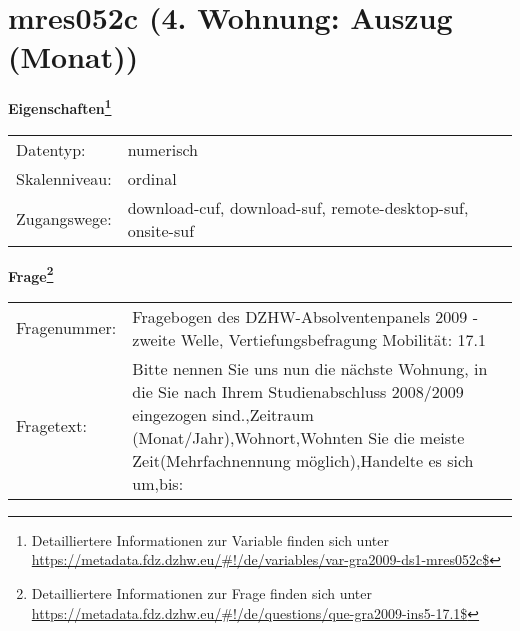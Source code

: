 
    \setcounter{footnote}{0}

    \vspace*{-1.8cm}
	\section{mres052c (4. Wohnung: Auszug (Monat))}
	\label{section:mres052c}



    \vspace*{0.5cm}
    \noindent\textbf{Eigenschaften\footnote{Detailliertere Informationen zur Variable finden sich unter
		\url{https://metadata.fdz.dzhw.eu/\#!/de/variables/var-gra2009-ds1-mres052c$}}}\\
	\begin{tabularx}{\hsize}{@{}lX}
	Datentyp: & numerisch \\
	Skalenniveau: & ordinal \\
	Zugangswege: &
	  download-cuf, 
	  download-suf, 
	  remote-desktop-suf, 
	  onsite-suf
 \\
    \end{tabularx}



				\vspace*{0.5cm}
                \noindent\textbf{Frage\footnote{Detailliertere Informationen zur Frage finden sich unter
		              \url{https://metadata.fdz.dzhw.eu/\#!/de/questions/que-gra2009-ins5-17.1$}}}\\
				\begin{tabularx}{\hsize}{@{}lX}
					Fragenummer: &
					  Fragebogen des DZHW-Absolventenpanels 2009 - zweite Welle, Vertiefungsbefragung Mobilität:
					  17.1
 \\
					Fragetext: & Bitte nennen Sie uns nun die nächste Wohnung, in die Sie nach Ihrem Studienabschluss 2008/2009 eingezogen sind.,Zeitraum (Monat/Jahr),Wohnort,Wohnten Sie die meiste Zeit(Mehrfachnennung möglich),Handelte es sich um,bis: \\
				\end{tabularx}





